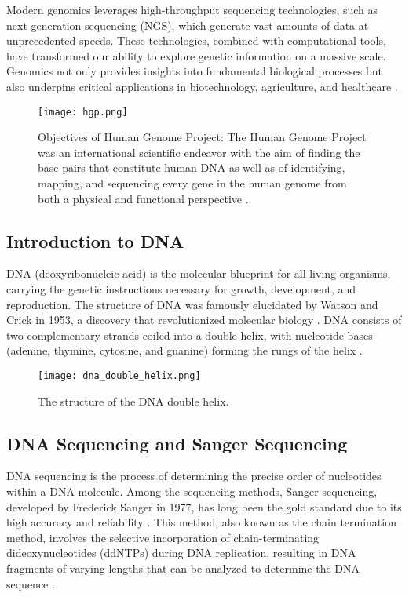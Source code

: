 Modern genomics leverages high-throughput sequencing technologies, such as next-generation sequencing (NGS), which generate vast amounts of data at unprecedented speeds. These technologies, combined with computational tools, have transformed our ability to explore genetic information on a massive scale. Genomics not only provides insights into fundamental biological processes but also underpins critical applications in biotechnology, agriculture, and healthcare \cite{metzker2010sequencing,mardis2017dna}.

\begin{figure}[H]
\centering
\texttt{[image: hgp.png]}
\caption{Objectives of Human Genome Project: The Human Genome Project was an international scientific endeavor with the aim of finding the base pairs that constitute human DNA as well as of identifying, mapping, and sequencing every gene in the human genome from both a physical and functional perspective \cite{sharma2023genetic_engineering}.}
\label{fig:hgp}
\end{figure}

\subsection{Introduction to DNA}
DNA (deoxyribonucleic acid) is the molecular blueprint for all living organisms, carrying the genetic instructions necessary for growth, development, and reproduction. The structure of DNA was famously elucidated by Watson and Crick in 1953, a discovery that revolutionized molecular biology \cite{watson_crick_dna}. DNA consists of two complementary strands coiled into a double helix, with nucleotide bases (adenine, thymine, cytosine, and guanine) forming the rungs of the helix \cite{khan_dna_structure}.

\begin{figure}[H]
\centering
\texttt{[image: dna\_double\_helix.png]}
\caption{The structure of the DNA double helix.}
\label{fig:dna_double_helix}
\end{figure}

\subsection{DNA Sequencing and Sanger Sequencing}
DNA sequencing is the process of determining the precise order of nucleotides within a DNA molecule. Among the sequencing methods, Sanger sequencing, developed by Frederick Sanger in 1977, has long been the gold standard due to its high accuracy and reliability \cite{sanger_method_original}. This method, also known as the chain termination method, involves the selective incorporation of chain-terminating dideoxynucleotides (ddNTPs) during DNA replication, resulting in DNA fragments of varying lengths that can be analyzed to determine the DNA sequence \cite{maxam1977sequencing}.

